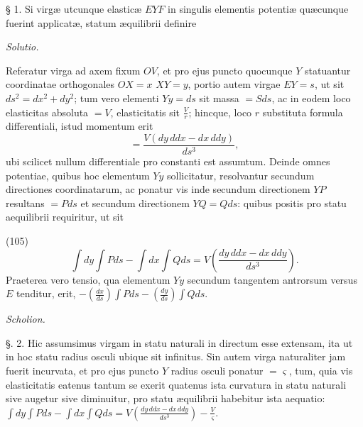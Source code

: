 \documentclass[11pt,a4paper]{article}
\begin{document}
§ 1. Si virgæ utcunque elasticæ $EYF$ in singulis elementis potentiæ
quæcunque fuerint applicatæ, statum æquilibrii definire

\emph{Solutio.}

Referatur virga ad axem fixum $OV$, et pro ejus puncto quocunque $Y$
statuantur coordinatae orthogonales $OX = x$ $XY = y$, portio autem virgae
$EY = s$, ut sit $ds^2 = dx^2 + dy^2$; tum vero elementi $Yy = ds$ sit
massa $= Sds$, ac in eodem loco elasticitas absoluta $= V$, 
elasticitatis sit $\frac{V}{r}$; hincque, loco $r$ substituta formula
differentiali, istud momentum erit
\[
= \frac{V(dy\,ddx - dx\,ddy)}{ds^3},
\]
ubi scilicet nullum differentiale pro constanti est assumtum. Deinde omnes
potentiae, quibus hoc elementum $Yy$ sollicitatur, resolvantur secundum
directiones coordinatarum, ac ponatur vis inde secundum directionem $YP$
resultans $= Pds$ et secundum directionem $YQ = Qds$: quibus positis pro
statu aequilibrii requiritur, ut sit

(105)
\[
\int dy \int Pds - \int dx \int Qds = V\left(\frac{dy\,ddx - dx\,ddy}{ds^3}\right).
\]
Praeterea vero tensio, qua elementum $Yy$ secundum tangentem
antrorsum versus $E$ tenditur, erit,
$-\left(\frac{dx}{ds}\right)\int Pds - \left(\frac{dy}{ds}\right)\int Qds$.

\emph{Scholion.}

§. 2. Hic assumsimus virgam in statu naturali in directum esse extensam,
ita ut in hoc statu radius osculi ubique sit infinitus. Sin autem virga
naturaliter jam fuerit incurvata, et pro ejus puncto $Y$ radius osculi
ponatur $= \varsigma$, tum, quia vis elasticitatis eatenus tantum se exerit
quatenus ista curvatura in statu naturali sive augetur sive diminuitur, pro
statu æquilibrii habebitur ista aequatio:
$\int dy \int Pds - \int dx \int Qds = V\left(\frac{dy\,ddx - dx\,ddy}{ds^3}\right) - \frac{V}{\varsigma}$.
\end{document}
